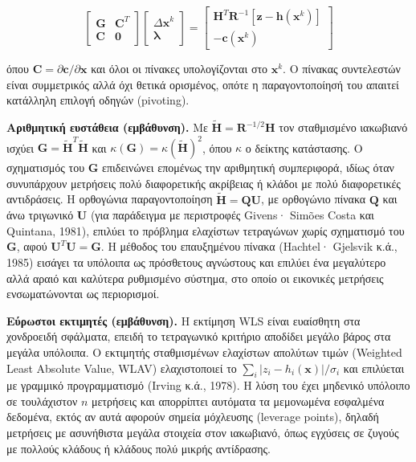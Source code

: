 \begin{equation}
\begin{bmatrix} \mathbf{G} & \mathbf{C}^{T} \\ \mathbf{C} & \mathbf{0} \end{bmatrix}
\begin{bmatrix} \Delta\mathbf{x}^{k} \\ \boldsymbol{\lambda} \end{bmatrix}
=
\begin{bmatrix} \mathbf{H}^{T}\mathbf{R}^{-1}\left[\mathbf{z} - \mathbf{h}(\mathbf{x}^{k})\right] \\ -\mathbf{c}(\mathbf{x}^{k}) \end{bmatrix}
\label{eq:eqconstr}
\end{equation}

όπου $\mathbf{C} = \partial\mathbf{c}/\partial\mathbf{x}$ και όλοι οι πίνακες υπολογίζονται στο
$\mathbf{x}^{k}$. Ο πίνακας συντελεστών είναι συμμετρικός αλλά όχι θετικά ορισμένος, οπότε η
παραγοντοποίησή του απαιτεί κατάλληλη επιλογή οδηγών (pivoting).

\textbf{Αριθμητική ευστάθεια (εμβάθυνση).} Με $\tilde{\mathbf{H}} = \mathbf{R}^{-1/2}\mathbf{H}$ τον
σταθμισμένο ιακωβιανό ισχύει $\mathbf{G} = \tilde{\mathbf{H}}^{T}\tilde{\mathbf{H}}$ και
$\kappa(\mathbf{G}) = \kappa(\tilde{\mathbf{H}})^2$, όπου $\kappa$ ο δείκτης κατάστασης. Ο
σχηματισμός του $\mathbf{G}$ επιδεινώνει επομένως την αριθμητική συμπεριφορά, ιδίως όταν
συνυπάρχουν μετρήσεις πολύ διαφορετικής ακρίβειας ή κλάδοι με πολύ διαφορετικές αντιδράσεις.
Η ορθογώνια παραγοντοποίηση $\tilde{\mathbf{H}} = \mathbf{Q}\mathbf{U}$, με ορθογώνιο πίνακα
$\mathbf{Q}$ και άνω τριγωνικό $\mathbf{U}$ (για παράδειγμα με περιστροφές Givens· Simões Costa και Quintana, 1981), επιλύει το
πρόβλημα ελαχίστων τετραγώνων χωρίς σχηματισμό του $\mathbf{G}$, αφού
$\mathbf{U}^{T}\mathbf{U} = \mathbf{G}$. Η μέθοδος του επαυξημένου πίνακα (Hachtel· Gjelsvik κ.ά., 1985) εισάγει τα
υπόλοιπα ως πρόσθετους αγνώστους και επιλύει ένα μεγαλύτερο αλλά αραιό και καλύτερα
ρυθμισμένο σύστημα, στο οποίο οι εικονικές μετρήσεις ενσωματώνονται ως περιορισμοί.

\textbf{Εύρωστοι εκτιμητές (εμβάθυνση).} Η εκτίμηση WLS είναι ευαίσθητη στα χονδροειδή σφάλματα, επειδή
το τετραγωνικό κριτήριο αποδίδει μεγάλο βάρος στα μεγάλα υπόλοιπα. Ο εκτιμητής σταθμισμένων
ελαχίστων απολύτων τιμών (Weighted Least Absolute Value, WLAV) ελαχιστοποιεί το
$\sum_{i} |z_i - h_i(\mathbf{x})|/\sigma_i$ και επιλύεται με γραμμικό προγραμματισμό (Irving κ.ά.,
1978). Η λύση του έχει μηδενικό υπόλοιπο σε τουλάχιστον $n$ μετρήσεις και απορρίπτει αυτόματα τα μεμονωμένα εσφαλμένα
δεδομένα, εκτός αν αυτά αφορούν σημεία μόχλευσης (leverage points), δηλαδή μετρήσεις με
ασυνήθιστα μεγάλα στοιχεία στον ιακωβιανό, όπως εγχύσεις σε ζυγούς με πολλούς κλάδους ή
κλάδους πολύ μικρής αντίδρασης.

